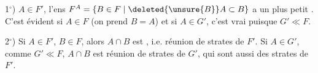 1$^\circ$) \deleted{$\forall$} $A\in F'$, l'ens $F^A=\{B\in F\mid \deleted{\unsure{B}}A\subset B\}$ a un plus petit . C'est évident si $A\in F$  (on prend $B=A$) et si $A\in G'$, c'est vrai puisque $G'\ll F$.

2$^\circ$) Si $A\in F'$, $B\in F$, alors $A\cap B$ est , i.e. réunion de strates de $F'$. Si $A\in G'$, comme $G'\ll F$, $A\cap B$ est réunion de strates de $G'$, qui sont aussi des strates de $F'$.

